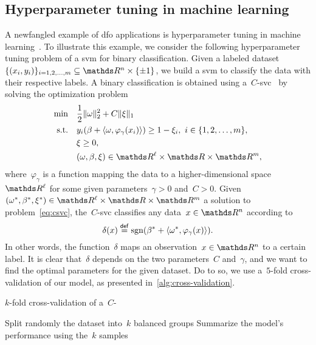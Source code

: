 \subsection{Hyperparameter tuning in machine learning}
\label{subsec:machine-learning}

A newfangled example of \gls{dfo} applications is hyperparameter tuning in machine learning~\cite{Ghanbari_Scheinberg_2017}.
To illustrate this example, we consider the following hyperparameter tuning problem of a \gls{svm} for binary classification.
Given a labeled dataset~$\set{(x_i, y_i)}_{i = 1, 2, \dots, m} \subseteq \R^n \times \set{\pm 1}$, we build a \gls{svm} to classify the data with their respective labels.
A binary classification is obtained using a~$C$-\gls{svc}~\cite{Chang_Lin_2011} by solving the optimization problem
\begin{subequations}
    \label{eq:csvc}
    \begin{align}
        \min        & \quad \frac{1}{2} \norm{\omega}_2^2 + C \norm{\xi}_1\\
        \text{s.t.} & \quad y_i (\beta + \inner{\omega, \varphi_{\gamma}(x_i)}) \ge 1 - \xi_i, ~ i \in \set{1, 2, \dots, m},\\
                    & \quad \xi \ge 0,\\
                    & \quad (\omega, \beta, \xi) \in \R^{\ell} \times \R \times \R^m,
    \end{align}
\end{subequations}
where~$\varphi_{\gamma}$ is a function mapping the data to a higher-dimensional space~$\R^{\ell}$ for some given parameters~$\gamma > 0$ and~$C > 0$.
Given~$(\omega^{\ast}, \beta^{\ast}, \xi^{\ast}) \in \R^{\ell} \times \R \times \R^m$ a solution to problem~\cref{eq:csvc}, the~$C$-\gls{svc} classifies any data~$x \in \R^n$ according to
\begin{equation*}
    \delta(x) \mathrel{\stackrel{\mathsf{def}}{=}} \operatorname{sgn}(\beta^{\ast} + \langle\omega^{\ast}, \varphi_{\gamma}(x)\rangle).
\end{equation*}
In other words, the function~$\delta$ maps an observation~$x \in \R^n$ to a certain label.
It is clear that~$\delta$ depends on the two parameters~$C$ and~$\gamma$, and we want to find the optimal parameters for the given dataset.
Do to so, we use a~$5$-fold cross-validation of our model, as presented in~\cref{alg:cross-validation}.

\begin{algorithm}[htp]
    \caption{$k$-fold cross-validation of a~$C$-}
    \label{alg:cross-validation}
    \DontPrintSemicolon
    Split randomly the dataset into~$k$ balanced groups\;
    Summarize the model's performance using the~$k$ samples\;
\end{algorithm}

